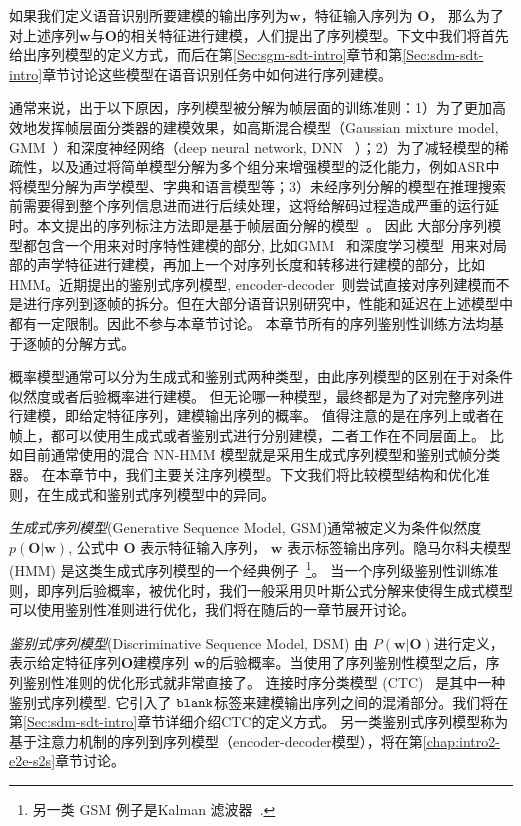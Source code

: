 如果我们定义语音识别所要建模的输出序列为$\mathbf w$，特征输入序列为 ${\mathbf O}$，
那么为了对上述序列$\mathbf w$与${\mathbf O}$的相关特征进行建模，人们提出了序列模型。下文中我们将首先给出序列模型的定义方式，而后在第\ref{Sec:sgm-sdt-intro}章节和第\ref{Sec:sdm-sdt-intro}章节讨论这些模型在语音识别任务中如何进行序列建模。

通常来说，出于以下原因，序列模型被分解为帧层面的训练准则：1）为了更加高效地发挥帧层面分类器的建模效果，如高斯混合模型（Gaussian mixture model, GMM~\cite{woodland1994large}）和深度神经网络（deep neural network, DNN ~\cite{hinton2012deep}）；2）为了减轻模型的稀疏性，以及通过将简单模型分解为多个组分来增强模型的泛化能力，例如ASR中将模型分解为声学模型、字典和语言模型等；3）未经序列分解的模型在推理搜索前需要得到整个序列信息进而进行后续处理，这将给解码过程造成严重的运行延时。本文提出的序列标注方法即是基于帧层面分解的模型~\cite{forney1973viterbi,mohri2002weighted}。
因此
大部分序列模型都包含一个用来对时序特性建模的部分, 比如GMM~\cite{woodland1994large} 和深度学习模型~\cite{hinton2012deep}用来对局部的声学特征进行建模，再加上一个对序列长度和转移进行建模的部分，比如HMM。近期提出的鉴别式序列模型, encoder-decoder~\cite{chan2016end}则尝试直接对序列建模而不是进行序列到逐帧的拆分。但在大部分语音识别研究中，性能和延迟在上述模型中都有一定限制。因此不参与本章节讨论。
本章节所有的序列鉴别性训练方法均基于逐帧的分解方式。

概率模型通常可以分为生成式和鉴别式两种类型，由此序列模型的区别在于对条件似然度或者后验概率进行建模。
但无论哪一种模型，最终都是为了对完整序列进行建模，即给定特征序列，建模输出序列的概率。
值得注意的是在序列上或者在帧上，都可以使用生成式或者鉴别式进行分别建模，二者工作在不同层面上。
比如目前通常使用的混合 NN-HMM 模型就是采用生成式序列模型和鉴别式帧分类器。
在本章节中，我们主要关注序列模型。下文我们将比较模型结构和优化准则，在生成式和鉴别式序列模型中的异同。


{\em 生成式序列模型}(Generative Sequence Model, GSM)通常被定义为条件似然度$p(\mathbf{O}|\mathbf{w})$, 公式中 ${\mathbf O}$ 表示特征输入序列， $\mathbf w$ 表示标签输出序列。隐马尔科夫模型 (HMM) 是这类生成式序列模型的一个经典例子~\footnote{另一类 GSM 例子是Kalman 滤波器~\cite{digalakis1991dynamical,abbeel2005discriminative}.}。
%
当一个序列级鉴别性训练准则，即序列后验概率，被优化时，我们一般采用贝叶斯公式分解来使得生成式模型可以使用鉴别性准则进行优化，我们将在随后的一章节展开讨论。



{\em 鉴别式序列模型}(Discriminative Sequence Model, DSM) 由 $P(\mathbf{w}|\mathbf{O})$进行定义，表示给定特征序列$\mathbf{O}$建模序列 $\mathbf{w}$的后验概率。当使用了序列鉴别性模型之后，序列鉴别性准则的优化形式就非常直接了。 
连接时序分类模型 (CTC)~\cite{graves2006connectionist} 是其中一种鉴别式序列模型. 它引入了 $\tt blank$标签来建模输出序列之间的混淆部分。我们将在第\ref{Sec:sdm-sdt-intro}章节详细介绍CTC的定义方式。
另一类鉴别式序列模型称为基于注意力机制的序列到序列模型（encoder-decoder模型），将在第\ref{chap:intro2-e2e-s2s}章节讨论。



